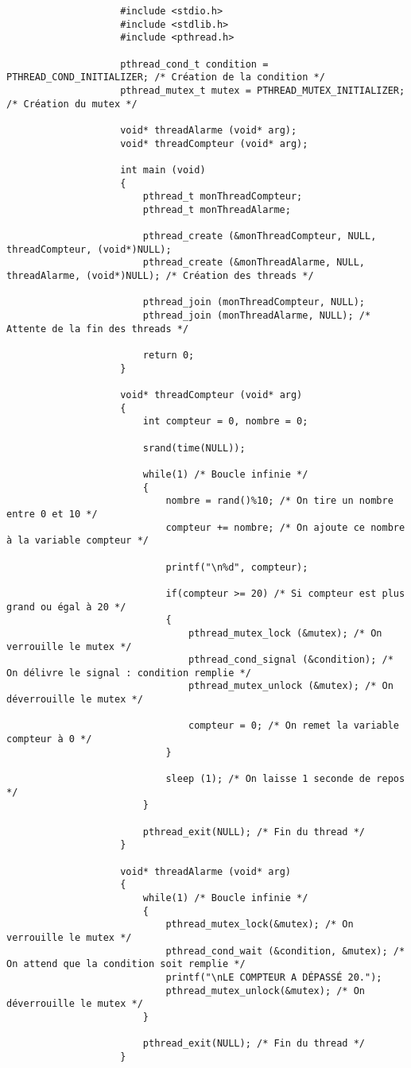 				\begin{lstlisting}
					#include <stdio.h>
					#include <stdlib.h>
					#include <pthread.h>

					pthread_cond_t condition = PTHREAD_COND_INITIALIZER; /* Création de la condition */
					pthread_mutex_t mutex = PTHREAD_MUTEX_INITIALIZER; /* Création du mutex */

					void* threadAlarme (void* arg);
					void* threadCompteur (void* arg);

					int main (void)
					{
						pthread_t monThreadCompteur;
						pthread_t monThreadAlarme;

						pthread_create (&monThreadCompteur, NULL, threadCompteur, (void*)NULL);
						pthread_create (&monThreadAlarme, NULL, threadAlarme, (void*)NULL); /* Création des threads */

						pthread_join (monThreadCompteur, NULL);
						pthread_join (monThreadAlarme, NULL); /* Attente de la fin des threads */

						return 0;
					}

					void* threadCompteur (void* arg)
					{
						int compteur = 0, nombre = 0;
						
						srand(time(NULL));

						while(1) /* Boucle infinie */
						{
							nombre = rand()%10; /* On tire un nombre entre 0 et 10 */
							compteur += nombre; /* On ajoute ce nombre à la variable compteur */

							printf("\n%d", compteur);
							
							if(compteur >= 20) /* Si compteur est plus grand ou égal à 20 */
							{
								pthread_mutex_lock (&mutex); /* On verrouille le mutex */
								pthread_cond_signal (&condition); /* On délivre le signal : condition remplie */
								pthread_mutex_unlock (&mutex); /* On déverrouille le mutex */

								compteur = 0; /* On remet la variable compteur à 0 */
							}

							sleep (1); /* On laisse 1 seconde de repos */
						}
						
						pthread_exit(NULL); /* Fin du thread */
					}

					void* threadAlarme (void* arg)
					{
						while(1) /* Boucle infinie */
						{
							pthread_mutex_lock(&mutex); /* On verrouille le mutex */
							pthread_cond_wait (&condition, &mutex); /* On attend que la condition soit remplie */
							printf("\nLE COMPTEUR A DÉPASSÉ 20."); 
							pthread_mutex_unlock(&mutex); /* On déverrouille le mutex */
						}
						
						pthread_exit(NULL); /* Fin du thread */
					}

				\end{lstlisting}